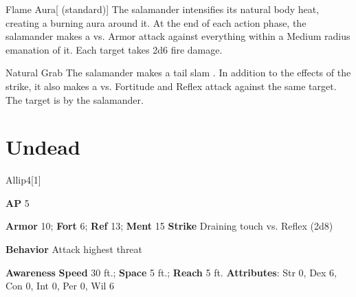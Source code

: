 \begin{apability}{Flame Aura}[ (standard)]
The salamander intensifies its natural body heat, creating a burning aura around it.
At the end of each action phase, the salamander makes a  vs. Armor
attack against everything within a Medium radius emanation of it.
\hit Each target takes 2d6 fire damage.
\end{apability}

\vspace{0.5em}
\begin{freeability}{Natural Grab}
The salamander makes a tail slam .
In addition to the effects of the strike, it also makes a  vs. Fortitude and Reflex attack against the same target.
\hit The target is  by the salamander.
\end{freeability}

\section{Undead}
\begin{monsection}{Allip}{4}[1]
\vspace{-1em}\vspace{-1em}
\begin{spellcontent}
\begin{spelltargetinginfo}
{\textbf{AP} 5}

\pari \textbf{Armor} 10;
\textbf{Fort} 6;
\textbf{Ref} 13;
\textbf{Ment} 15
\pari \textbf{Strike} Draining touch  vs. Reflex (2d8)



\pari \textbf{Behavior} Attack highest threat
\end{spelltargetinginfo}
\end{spellcontent}

\begin{monsterfooter}
\pari \textbf{Awareness} 
\pari \textbf{Speed} 30 ft.;
\textbf{Space} 5 ft.;
\textbf{Reach} 5 ft.
\pari \textbf{Attributes}:
Str 0,
Dex 6,
Con 0,
Int 0,
Per 0,
Wil 6
\end{monsterfooter}
\end{monsection}


